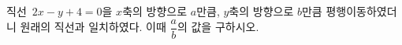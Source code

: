 직선~$2x-y+4=0$을 $x$축의 방향으로 $a$만큼, $y$축의 방향으로 $b$만큼 평행이동하였더니 원래의 직선과 일치하였다. 이때 $\dfrac{a}{b}$의 값을 구하시오. 
